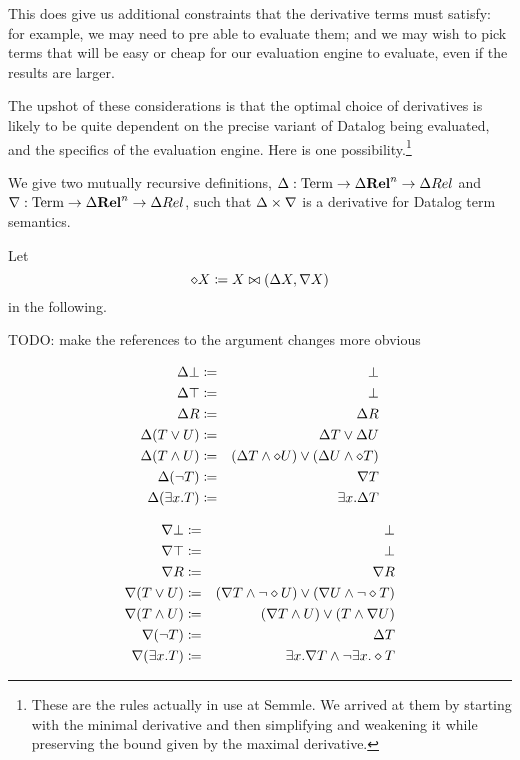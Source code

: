 This does give us additional constraints that the derivative terms must satisfy:
for example, we may need to pre
able to evaluate them; and we may wish to pick terms that will be easy or cheap
for our evaluation engine to evaluate, even if the results are larger.

The upshot of these considerations is that the optimal choice of derivatives is likely
to be quite dependent on the precise variant of Datalog being evaluated, and the
specifics of the evaluation engine. Here is one possibility.\footnote{These are
  the rules actually in use at Semmle. We arrived at them by starting with the
  minimal derivative and then simplifying and weakening it while preserving the
  bound given by the maximal derivative.}

\newcommand{\bothdiff}{\diamond}
\begin{thm}
\label{thm:concreteDatalog}
  We give two mutually recursive definitions,
  $\Delta: \mathrm{Term} \rightarrow \Delta \mathbf{Rel}^n \rightarrow \Delta Rel$ and
  $\nabla: \mathrm{Term} \rightarrow \Delta \mathbf{Rel}^n \rightarrow \Delta Rel$, such
  that $\Delta \times \nabla$ is a derivative for Datalog term semantics.
  
  Let $$\diamond X \coloneqq X \bowtie (\Delta X, \nabla X)$$ in the following.

  TODO: make the references to the argument changes more obvious
  
  \begin{eqnarray*}
  \updiff\bot & \defeq & \bot\\
  \updiff\top & \defeq & \bot\\
  \updiff R & \defeq & \updiff R\\
  \updiff(T\vee U) & \defeq & \updiff T \vee \updiff U\\
  \updiff(T\wedge U) & \defeq & (\updiff T\wedge \bothdiff U) 
                           \vee 
                           (\updiff U \wedge \bothdiff T)\\
  \updiff(\neg T) & \defeq & \downdiff T\\
  \updiff(\exists x.T) & \defeq & \exists x.\updiff T
  \end{eqnarray*}

  \begin{eqnarray*}
  \downdiff\bot & \defeq & \bot\\
  \downdiff\top & \defeq & \bot\\
  \downdiff R & \defeq & \downdiff R\\
  \downdiff(T\vee U) & \defeq & (\downdiff T \wedge \neg \bothdiff U) 
                           \vee 
                           (\downdiff U \wedge \neg \bothdiff T)\\
  \downdiff(T\wedge U) & \defeq & (\downdiff T\wedge U) \vee (T \wedge \downdiff U)\\
  \downdiff(\neg T) & \defeq & \updiff T\\
  \downdiff(\exists x.T) & \defeq & \exists x.\downdiff T \wedge \neg \exists x.\bothdiff T
  \end{eqnarray*}
\end{thm}
